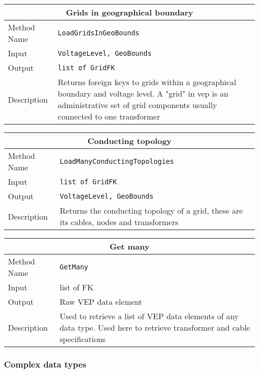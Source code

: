 \vspace{.5cm}

\begin{tabular}{ l  p{12cm}} 
    \hline
    \multicolumn{2}{c}{\textbf{Grids in geographical boundary}}\\
    \hline
    Method Name     & \texttt{LoadGridsInGeoBounds} \\
    Input           & \texttt{VoltageLevel, GeoBounds}\\
    Output          & \texttt{list of GridFK}\\
    Description     & Returns foreign keys to grids within a geographical boundary and voltage level. A "grid" in vep is an administrative set of grid components usually connected to one transformer\\
\end{tabular}

\vspace{.5cm}

\begin{tabular}{ l  p{12cm}} 
    \hline
    \multicolumn{2}{c}{\textbf{Conducting topology}}\\
    \hline
    Method Name     & \texttt{LoadManyConductingTopologies} \\
    Input           & \texttt{list of GridFK}\\
    Output          & \texttt{VoltageLevel, GeoBounds} \\
    Description     & Returns the conducting topology of a grid, these are its cables, nodes and transformers\\
\end{tabular}

\vspace{.5cm}

\begin{tabular}{ l  p{12cm}} 
    \hline
    \multicolumn{2}{c}{\textbf{Get many}}\\
    \hline
    Method Name     & \texttt{GetMany} \\
    Input           & list of FK\\
    Output          & Raw VEP data element \\
    Description     & Used to retrieve a list of VEP data elements of any data type. Used here to retrieve transformer and cable specifications\\
\end{tabular}

\subsubsection{Complex data types}

